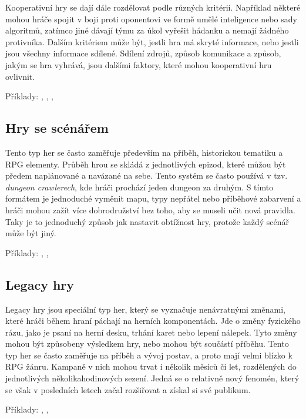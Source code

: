 Kooperativní hry se dají dále rozdělovat podle různých kritérií. Například některé mohou hráče spojit v boji proti oponentovi ve formě umělé inteligence nebo sady algoritmů, zatímco jiné dávají týmu za úkol vyřešit hádanku a nemají žádného protivníka. Dalším kritériem může být, jestli hra má skryté informace, nebo jestli jsou všechny informace sdílené. Sdílení zdrojů, způsob komunikace a způsob, jakým se hra vyhrává, jsou dalšími faktory, které mohou kooperativní hru ovlivnit.

Příklady: , , , 


\subsection{Hry se scénářem}
\label{subsec:structure_scenario}

Tento typ her se často zaměřuje především na příběh, historickou tematiku a RPG elementy. Průběh hrou se skládá z jednotlivých epizod, které můžou být předem naplánované a navázané na sebe. Tento systém se často používá v tzv. \textit{dungeon crawlerech}, kde hráči prochází jeden dungeon za druhým. S tímto formátem je jednoduché vyměnit mapu, typy nepřátel nebo příběhové zabarvení a hráči mohou zažít více dobrodružství bez toho, aby se museli učit nová pravidla. Taky je to jednoduchý způsob jak nastavit obtížnost hry, protože každý scénář může být jiný.

Příklady: , , 

\subsection{Legacy hry}
\label{subsec:structure_legacy}

Legacy hry jsou speciální typ her, který se vyznačuje nenávratnými změnami, které hráči během hraní páchají na herních komponentách. Jde o změny fyzického rázu, jako je psaní na herní desku, trhání karet nebo lepení nálepek. Tyto změny mohou být způsobeny výsledkem hry, nebo mohou být součástí příběhu. Tento typ her se často zaměřuje na příběh a vývoj postav, a proto mají velmi blízko k RPG žánru. Kampaně v nich mohou trvat i několik měsíců či let, rozdělených do jednotlivých několikahodinových sezení. Jedná se o relativně nový fenomén, který se však v posledních letech začal rozšiřovat a získal si své publikum.

Příklady: , , 



